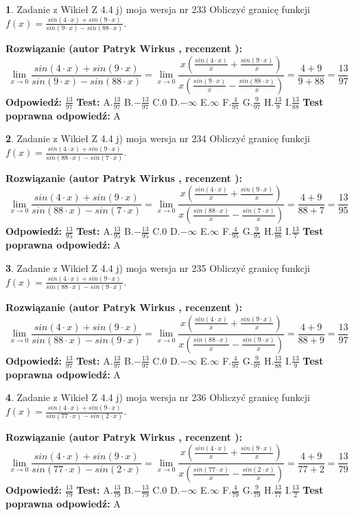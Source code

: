 \documentclass[12pt, a4paper]{article}
\theoremstyle{definition} %
\newtheorem{zad}{}
\newcommand{\zadStart}[1]{\begin{zad}#1\newline}
\newcommand{\zadStop}{\end{zad}}
\newcommand{\rozwStart}[2]{\noindent \textbf{Rozwiązanie (autor #1 , recenzent #2): }\newline}
\newcommand{\rozwStop}{\newline}
\newcommand{\odpStart}{\noindent \textbf{Odpowiedź:}\newline}
\newcommand{\odpStop}{\newline}
\newcommand{\testStart}{\noindent \textbf{Test:}\newline}
\newcommand{\testStop}{\newline}
\newcommand{\kluczStart}{\noindent \textbf{Test poprawna odpowiedź:}\newline}
\newcommand{\kluczStop}{\newline}
\begin{document}
\zadStart{Zadanie z Wikieł Z 4.4 j) moja wersja nr 233}
Obliczyć granicę funkcji $f(x)=\frac{sin(4\cdot x) +sin(9\cdot x)}{sin(9\cdot x) -sin(88\cdot x)}$.
\zadStop
\rozwStart{Patryk Wirkus}{}
$$\lim\limits_{x\to 0}\frac{sin(4\cdot x) +sin(9\cdot x)}{sin(9\cdot x) -sin(88\cdot x)}=\lim\limits_{x\to 0}\frac{x(\frac{sin(4\cdot x)}{x}+\frac{sin(9\cdot x)}{x})}{x(\frac{sin(9\cdot x)}{x}-\frac{sin(88\cdot x)}{x})}=\frac{4+9}{9+88} = \frac{13}{97}$$
\rozwStop
\odpStart
$\frac{13}{97}$
\odpStop
\testStart
A.$\frac{13}{97}$
B.$-\frac{13}{97}$
C.$0$
D.$-\infty$
E.$\infty$
F.$\frac{4}{97}$
G.$\frac{9}{97}$
H.$\frac{13}{9}$
I.$\frac{13}{88}$
\testStop
\kluczStart
A
\kluczStop



\zadStart{Zadanie z Wikieł Z 4.4 j) moja wersja nr 234}
Obliczyć granicę funkcji $f(x)=\frac{sin(4\cdot x) +sin(9\cdot x)}{sin(88\cdot x) -sin(7\cdot x)}$.
\zadStop
\rozwStart{Patryk Wirkus}{}
$$\lim\limits_{x\to 0}\frac{sin(4\cdot x) +sin(9\cdot x)}{sin(88\cdot x) -sin(7\cdot x)}=\lim\limits_{x\to 0}\frac{x(\frac{sin(4\cdot x)}{x}+\frac{sin(9\cdot x)}{x})}{x(\frac{sin(88\cdot x)}{x}-\frac{sin(7\cdot x)}{x})}=\frac{4+9}{88+7} = \frac{13}{95}$$
\rozwStop
\odpStart
$\frac{13}{95}$
\odpStop
\testStart
A.$\frac{13}{95}$
B.$-\frac{13}{95}$
C.$0$
D.$-\infty$
E.$\infty$
F.$\frac{4}{95}$
G.$\frac{9}{95}$
H.$\frac{13}{88}$
I.$\frac{13}{7}$
\testStop
\kluczStart
A
\kluczStop



\zadStart{Zadanie z Wikieł Z 4.4 j) moja wersja nr 235}
Obliczyć granicę funkcji $f(x)=\frac{sin(4\cdot x) +sin(9\cdot x)}{sin(88\cdot x) -sin(9\cdot x)}$.
\zadStop
\rozwStart{Patryk Wirkus}{}
$$\lim\limits_{x\to 0}\frac{sin(4\cdot x) +sin(9\cdot x)}{sin(88\cdot x) -sin(9\cdot x)}=\lim\limits_{x\to 0}\frac{x(\frac{sin(4\cdot x)}{x}+\frac{sin(9\cdot x)}{x})}{x(\frac{sin(88\cdot x)}{x}-\frac{sin(9\cdot x)}{x})}=\frac{4+9}{88+9} = \frac{13}{97}$$
\rozwStop
\odpStart
$\frac{13}{97}$
\odpStop
\testStart
A.$\frac{13}{97}$
B.$-\frac{13}{97}$
C.$0$
D.$-\infty$
E.$\infty$
F.$\frac{4}{97}$
G.$\frac{9}{97}$
H.$\frac{13}{88}$
I.$\frac{13}{9}$
\testStop
\kluczStart
A
\kluczStop



\zadStart{Zadanie z Wikieł Z 4.4 j) moja wersja nr 236}
Obliczyć granicę funkcji $f(x)=\frac{sin(4\cdot x) +sin(9\cdot x)}{sin(77\cdot x) -sin(2\cdot x)}$.
\zadStop
\rozwStart{Patryk Wirkus}{}
$$\lim\limits_{x\to 0}\frac{sin(4\cdot x) +sin(9\cdot x)}{sin(77\cdot x) -sin(2\cdot x)}=\lim\limits_{x\to 0}\frac{x(\frac{sin(4\cdot x)}{x}+\frac{sin(9\cdot x)}{x})}{x(\frac{sin(77\cdot x)}{x}-\frac{sin(2\cdot x)}{x})}=\frac{4+9}{77+2} = \frac{13}{79}$$
\rozwStop
\odpStart
$\frac{13}{79}$
\odpStop
\testStart
A.$\frac{13}{79}$
B.$-\frac{13}{79}$
C.$0$
D.$-\infty$
E.$\infty$
F.$\frac{4}{79}$
G.$\frac{9}{79}$
H.$\frac{13}{77}$
I.$\frac{13}{2}$
\testStop
\kluczStart
A
\kluczStop
\end{document}
